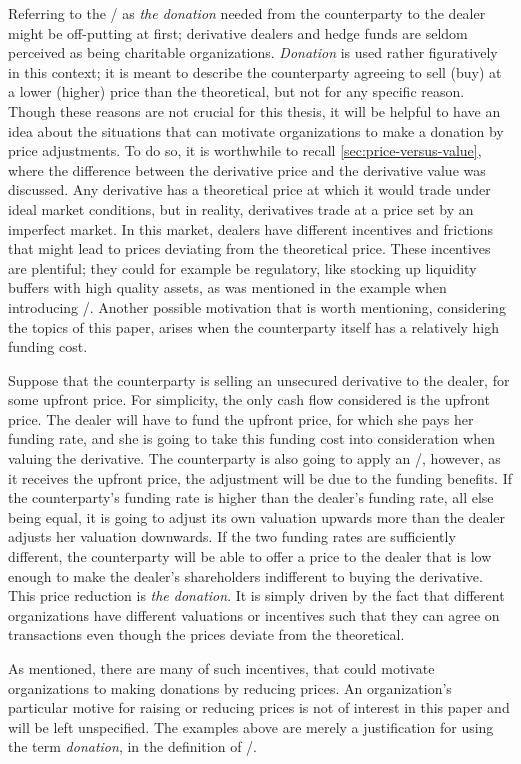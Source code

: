 \documentclass[main.tex]{subfiles}
\begin{document}
        Referring to the \FVA/ as \textit{the donation} needed from the counterparty to the dealer
        might be off-putting at first;
        derivative dealers and hedge funds are seldom perceived as being charitable organizations.
        \textit{Donation} is used rather figuratively in this context;
        it is meant to describe the counterparty agreeing 
        to sell (buy) at a lower (higher) price than the theoretical,
        but not for any specific reason.
        Though these reasons are not crucial for this thesis,
        it will be helpful to have an idea about the situations that can motivate organizations
        to make a donation by price adjustments.
        To do so, it is worthwhile to recall \cref{sec:price-versus-value},
        where the difference between the derivative price and the derivative value was discussed.
        Any derivative has a theoretical price 
        at which it would trade under ideal market conditions,
        but in reality, derivatives trade at a price set by an imperfect market.
        In this market, dealers have different incentives and frictions
        that might lead to prices deviating from the theoretical price.
        These incentives are plentiful; they could for example be regulatory, 
        like stocking up liquidity buffers with high quality assets,
        as was mentioned in the example when introducing \FVA/.
        Another possible motivation that is worth mentioning, considering the topics of this paper,
        arises when the counterparty itself has a relatively high funding cost.

        Suppose that the counterparty is selling an unsecured derivative to the dealer, 
        for some upfront price. 
        For simplicity, the only cash flow considered is the upfront price.
        The dealer will have to fund the upfront price, for which she pays her funding rate,
        and she is going to take this funding cost into consideration when valuing the derivative.
        The counterparty is also going to apply an \FVA/, however, as it receives the upfront price,
        the adjustment will be due to the funding benefits.
        If the counterparty's funding rate is higher than the dealer's funding rate,
        all else being equal, it is going to adjust its own valuation upwards more 
        than the dealer adjusts her valuation downwards. 
        If the two funding rates are sufficiently different, 
        the counterparty will be able to offer a price to the dealer
        that is low enough to make the dealer's shareholders indifferent to buying the derivative.
        This price reduction is \textit{the donation}.
        It is simply driven by the fact that different organizations 
        have different valuations or incentives such that they can agree on transactions
        even though the prices deviate from the theoretical.

        As mentioned, there are many of such incentives, 
        that could motivate organizations to making donations by reducing prices. 
        An organization's particular motive for raising or reducing prices
        is not of interest in this paper and will be left unspecified.
        The examples above are merely a justification for using the term \textit{donation},
        in the definition of \FVA/.
\end{document}
